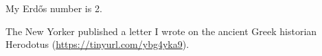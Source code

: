 
\begin{cventries}
\vspace{-6mm}
  \cventry
    {} %
    {} %
    {} %
    {} %
    {
      \begin{cvitems} %
        \item {My Erd\H{o}s number is 2.}
        \item {The New Yorker published a letter I wrote on the ancient Greek historian Herodotus (\url{https://tinyurl.com/ybg4yka9}).}
      \end{cvitems}
    }

\end{cventries}
